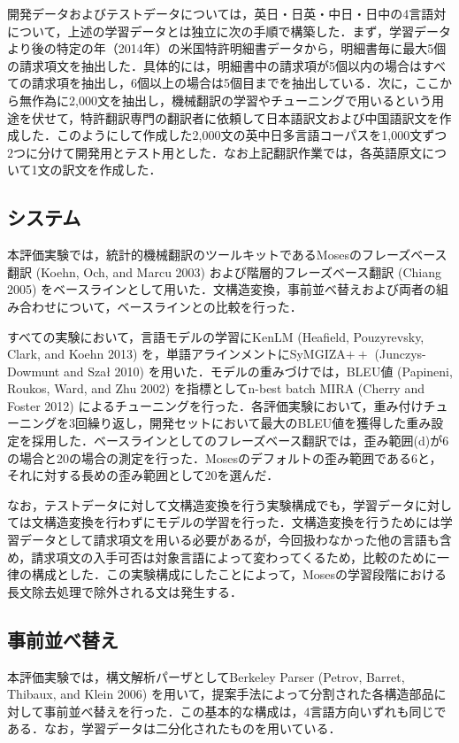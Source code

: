\documentclass[japanese]{jnlp_1.4}
\begin{document}
開発データおよびテストデータについては，英日・日英・中日・日中の4言語対について，上述の学習データとは独立に次の手順で構築した．まず，学習データより後の特定の年（2014年）の米国特許明細書データから，明細書毎に最大5個の請求項文を抽出した．具体的には，明細書中の請求項が5個以内の場合はすべての請求項を抽出し，6個以上の場合は5個目までを抽出している．次に，ここから無作為に2,000文を抽出し，機械翻訳の学習やチューニングで用いるという用途を伏せて，特許翻訳専門の翻訳者に依頼して日本語訳文および中国語訳文を作成した．このようにして作成した2,000文の英中日多言語コーパスを1,000文ずつ2つに分けて開発用とテスト用とした．なお上記翻訳作業では，各英語原文について1文の訳文を作成した．


\subsection{システム}

本評価実験では，統計的機械翻訳のツールキットであるMosesのフレーズベース翻訳 (Koehn, 
Och, and Marcu 2003) および階層的フレーズベース翻訳 (Chiang 
2005) をベースラインとして用いた．文構造変換，事前並べ替えおよび両者の組み合わせについて，ベースラインとの比較を行った．

すべての実験において，言語モデルの学習にKenLM (Heafield, Pouzyrevsky, Clark, 
and Koehn 2013) を，単語アラインメントにSyMGIZA$++$ (Junczys-Dowmunt and 
Sza{\l} 2010) を用いた．モデルの重みづけでは，BLEU値 (Papineni, Roukos, Ward, 
and Zhu 2002) を指標としてn-best batch MIRA (Cherry and Foster 
2012) によるチューニングを行った．各評価実験において，重み付けチューニングを3回繰り返し，開発セットにおいて最大のBLEU値を獲得した重み設定を採用した．ベースラインとしてのフレーズベース翻訳では，歪み範囲(d)が6の場合と20の場合の測定を行った．Mosesのデフォルトの歪み範囲である6と，それに対する長めの歪み範囲として20を選んだ．

なお，テストデータに対して文構造変換を行う実験構成でも，学習データに対しては文構造変換を行わずにモデルの学習を行った．文構造変換を行うためには学習データとして請求項文を用いる必要があるが，今回扱わなかった他の言語も含め，請求項文の入手可否は対象言語によって変わってくるため，比較のために一律の構成とした．この実験構成にしたことによって，Mosesの学習段階における長文除去処理で除外される文は発生する．


\subsection{事前並べ替え}

本評価実験では，構文解析パーザとしてBerkeley Parser (Petrov, Barret, Thibaux, and Klein 2006) を用いて，提案手法によって分割された各構造部品に対して事前並べ替えを行った．この基本的な構成は，4言語方向いずれも同じである．なお，学習データは二分化されたものを用いている．
\end{document}
